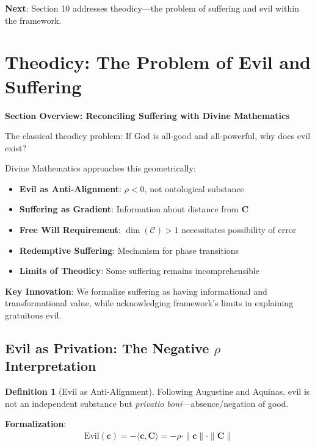 \documentclass[11pt,a4paper]{article}
\theoremstyle{definition}
\newtheorem{definition}{Definition}[section]
\theoremstyle{remark}
\newcommand{\CC}{\mathcal{C}}
\newcommand{\cc}{\mathbf{c}}
\begin{document}
\begin{enumerate}
\begin{mdframed}[backgroundcolor=green!10,linewidth=2pt,linecolor=green!70!black]
\textbf{Next}: Section 10 addresses theodicy—the problem of suffering and evil within the framework.
\end{mdframed}


\section{Theodicy: The Problem of Evil and Suffering}

\begin{mdframed}[backgroundcolor=cyan!5,linewidth=2pt]
\textbf{Section Overview: Reconciling Suffering with Divine Mathematics}

The classical theodicy problem: If God is all-good and all-powerful, why does evil exist?

Divine Mathematics approaches this geometrically:

\begin{itemize}[nosep]
    \item \textbf{Evil as Anti-Alignment}: \(\rho < 0\), not ontological substance
    \item \textbf{Suffering as Gradient}: Information about distance from \(\mathbf{C}\)
    \item \textbf{Free Will Requirement}: \(\dim(\CC) > 1\) necessitates possibility of error
    \item \textbf{Redemptive Suffering}: Mechanism for phase transitions
    \item \textbf{Limits of Theodicy}: Some suffering remains incomprehensible
\end{itemize}

\textbf{Key Innovation}: We formalize suffering as having informational and transformational value, while acknowledging framework's limits in explaining gratuitous evil.
\end{mdframed}

\subsection{Evil as Privation: The Negative \(\rho\) Interpretation}

\begin{definition}[Evil as Anti-Alignment]
Following Augustine and Aquinas, evil is not an independent substance but \textit{privatio boni}—absence/negation of good.

\textbf{Formalization}:
\begin{align}
\text{Evil}(\cc) = -\langle \cc, \mathbf{C} \rangle = -\rho \cdot \|\cc\| \cdot \|\mathbf{C}\|
\end{align}


\end{definition}
\end{enumerate}
\end{document}
